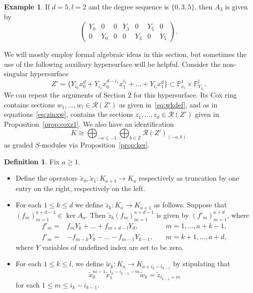 \documentclass[a4paper,11pt]{amsart}
\theoremstyle{plain}
\theoremstyle{definition}
\newtheorem{definition}[theorem]{Definition}
\newtheorem{example}[theorem]{Example}
\newcommand{\p}{\mathbb{P}}
\newcommand{\R}{\mathcal{R}}
\newcommand{\Z}{\mathbb{Z}}
\begin{document}
\begin{example}
    If $d = 5, l = 2$ and the degree sequence is $\{0,3,5\}$, then $A_3$ is given by
\begin{equation*}
    \begin{pmatrix}
   Y_{0} & 0 & 0 & Y_{3} & 0 & Y_{5} & 0 \\
   0 & Y_{0} & 0 & 0 & Y_{3} & 0 & Y_{5}
    \end{pmatrix}.
    \end{equation*}
\end{example}

We will mostly employ formal algebraic ideas in this section, but sometimes the use of the following auxiliary hypersurface will be helpful. Consider the non-singular hypersurface
    \[
    Z' = \{Y_{i_0} x_0^{d} + Y_{i_1} x_0^{d-i_1} x_1^{i_1} + \dots + Y_{i_l} x_1^d\} \subset \p_{x_i}^1 \times \p_{Y_{i_k}}^l.
    \]
We can repeat the arguments of Section 2 for this hypersurface. Its Cox ring contains sections $w_1,\dots,w_l\in\R(Z')$ as given in~\eqref{eq:wkdef}, and as in equations~\eqref{eq:zinxw}, contains the sections $z_1,\dots,z_d\in\R(Z')$ given in Proposition~\ref{prop:coxz1}. We also have an identification 
\begin{equation}\label{eq:KandZ'} K\cong \bigoplus_{-a \leq -1} \bigoplus_{b\in\Z} \R(Z')_{(-a,b)}\end{equation}
as graded $S$-modules via Proposition~\ref{prop:ker}.

\begin{definition}
    Fix $a \geq 1$.
\begin{itemize}
    \item[(i)] Define the operators $\tilde x_0, \tilde x_1\colon K_{a+1} \rightarrow K_a$ respectively as truncation by one entry on the right, respectively on the left.
    \item[(ii)] For each $1 \leq k \leq d$ we define $\tilde z_k: K_a \rightarrow K_{a+1}$ as follows. Suppose that $(f_m)_{m=1}^{a+d-1} \in \ker A_a$. Then $ \tilde z_k (f_m)_{m=1}^{a+d-1}$ is given by $(f'_m)_{m=1}^{a+d}$, where
    \begin{align*}
        f'_m =& f_m Y_k + \dots + f_{m+d-l} Y_d,& \quad m = 1,\dots,a+k-1, \\
        f'_m =& -f_{m-k} Y_0 - \dots - f_{m-1} Y_{k-1},& \quad m = k+1,\dots, a+d,
    \end{align*}
    where $Y$ variables of undefined index are set to be zero.
    \item[(iii)] For each $1 \leq k \leq l$, we define $\tilde w_k : K_{a} \rightarrow K_{a+i_k - i_{k-1}}$ by stipulating that
    \[
    \tilde x_0^{m-1} \tilde x_1^{i_k - i_{k-1}-m} \tilde w_k = \tilde z_{i_{k-1}+m}
    \]
    for each $1 \leq m \le i_k - i_{k-1}$.
\end{itemize}
    \label{operators1}
\end{definition}
\end{document}
